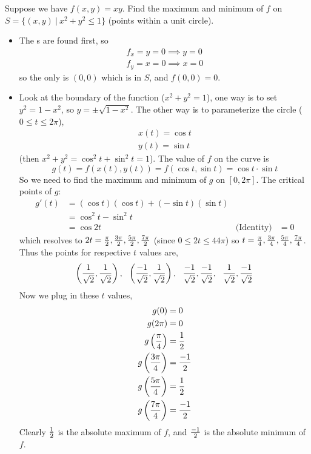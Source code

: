 \documentclass[english, 11pt]{article}
\begin{document}
\begin{exmp}
  Suppose we have $f(x,y) = xy$. Find the maximum and minimum of $f$ on $S = \{(x,y) \ | \ x^2 + y^2 \leq 1 \}$ (points within a unit circle). \\

  \begin{itemize}
    \item The s are found first, so
    \begin{align*}
      f_x = y = 0 \implies y = 0 \\
      f_y = x = 0 \implies x = 0
    \end{align*}
    so the only  is $(0,0)$ which is in $S$, and $f(0,0) = 0$.
    \item Look at the boundary of the function ($x^2 + y^2 = 1$), one way is to set $y^2 = 1-x^2$, so $y = \pm \sqrt{1-x^2}$. The other way is to parameterize the circle ($0 \leq t \leq 2\pi$),
    \begin{align*}
      x(t) = \cos t \\
      y(t) = \sin t
    \end{align*}
    (then $x^2 + y^2 = \cos^2 t + \sin^2 t = 1$). The value of $f$ on the curve is
    \[g(t) =  f(x(t),y(t)) = f(\cos t, \sin t) = \cos t \cdot \sin t \]
    So we need to find the maximum and minimum of $g$ on $[0,2\pi]$. The critical points of $g$:
    \begin{align*}
      g'(t) & = (\cos t) (\cos t) + (-\sin t)(\sin t) \\
      & = \cos^2 t - \sin^2 t \\
      & = \cos 2t & \mbox{(Identity)}
      & = 0
    \end{align*}
    which resolves to $2t = \frac{\pi}{2}, \frac{3\pi}{2}, \frac{5\pi}{2}, \frac{7\pi}{2}$ (since $0 \leq 2t \leq 4 4\pi$) so $t = \frac{\pi}{4}, \frac{3\pi}{4}, \frac{5\pi}{4}, \frac{7\pi}{4}$. Thus the points for respective $t$ values are,
    \[ \left( \frac{1}{\sqrt{2}}, \frac{1}{\sqrt{2}} \right), \ \ \left( \frac{-1}{\sqrt{2}}, \frac{1}{\sqrt{2}} \right), \ \ \frac{-1}{\sqrt{2}}, \frac{-1}{\sqrt{2}} , \ \ \frac{1}{\sqrt{2}}, \frac{-1}{\sqrt{2}}\]
    Now we plug in these $t$ values,
    \begin{align*}
      g(0) & = 0 \\
      g(2\pi) & = 0 \\
      g \left( \frac{\pi}{4} \right) & = \frac{1}{2} \\
      g \left( \frac{3\pi}{4} \right) & = \frac{-1}{2} \\
      g \left( \frac{5\pi}{4} \right) & = \frac{1}{2} \\
      g \left( \frac{7\pi}{4} \right) & = \frac{-1}{2}
    \end{align*}
    Clearly $\frac{1}{2}$ is the absolute maximum of $f$, and $\frac{-1}{2}$ is the absolute minimum of $f$.
    \end{itemize}
\end{exmp}
\end{document}
